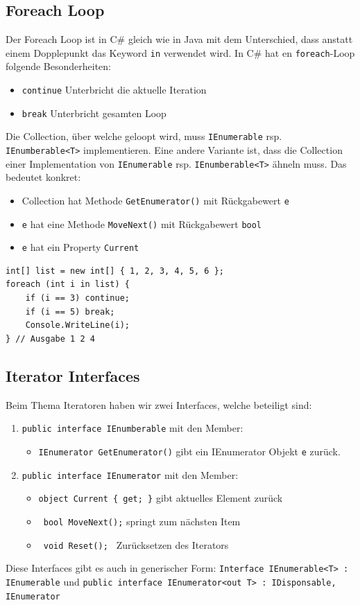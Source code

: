 \documentclass[
a4paper,
oneside,
10pt,
fleqn,
headsepline,
toc=listofnumbered, 
bibliography=totocnumbered]{scrartcl}
\begin{document}
\subsection{Foreach Loop}
Der Foreach Loop ist in C\# gleich wie in Java mit dem Unterschied, dass anstatt einem Dopplepunkt das Keyword \lstinline|in| verwendet wird. In C# hat en \lstinline|foreach|-Loop folgende Besonderheiten:
\begin{itemize}
    \item \lstinline|continue| Unterbricht die aktuelle Iteration
    \item \lstinline|break| Unterbricht gesamten Loop
\end{itemize}
Die Collection, über welche geloopt wird, muss \lstinline|IEnumerable| rsp. \lstinline|IEnumberable<T>| implementieren. Eine andere Variante ist, dass die Collection einer Implementation von \lstinline|IEnumerable| rsp. \lstinline|IEnumberable<T>| ähneln muss. Das bedeutet konkret:
\begin{itemize}
    \item Collection hat Methode \lstinline|GetEnumerator()| mit Rückgabewert \lstinline|e|
    \item \lstinline|e| hat eine Methode \lstinline|MoveNext()| mit Rückgabewert \lstinline|bool|
    \item \lstinline|e| hat ein Property \lstinline|Current|
\end{itemize}

\begin{lstlisting}
int[] list = new int[] { 1, 2, 3, 4, 5, 6 };
foreach (int i in list) {
	if (i == 3) continue;
	if (i == 5) break;
	Console.WriteLine(i);
} // Ausgabe 1 2 4
\end{lstlisting}

\subsection{Iterator Interfaces}
Beim Thema Iteratoren haben wir zwei Interfaces, welche beteiligt sind:
\begin{enumerate}
    \item \lstinline|public interface IEnumberable| mit den Member:
    \begin{itemize}
        \item \lstinline|IEnumerator GetEnumerator()| gibt ein IEnumerator Objekt \lstinline|e| zurück.
    \end{itemize}
    \item \lstinline|public interface IEnumerator| mit den Member:
    \begin{itemize}
        \item \lstinline|object Current { get; }| gibt aktuelles Element zurück
        \item \lstinline| bool MoveNext();| springt zum nächsten Item
        \item \lstinline| void Reset(); | Zurücksetzen des Iterators
    \end{itemize}
\end{enumerate}
Diese Interfaces gibt es auch in generischer Form: \lstinline|Interface IEnumerable<T> : IEnumerable| und \lstinline|public interface IEnumerator<out T> : IDisponsable, IEnumerator|
\end{document}
